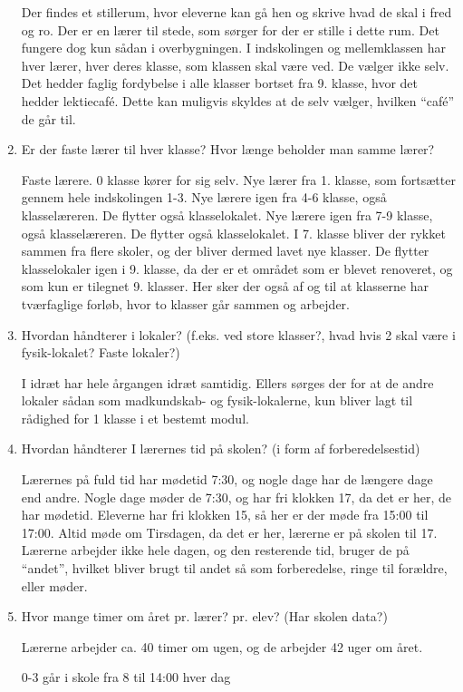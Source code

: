 \begin{enumerate}
	Der findes et stillerum, hvor eleverne kan gå hen og skrive hvad de skal i fred og ro. Der er en lærer til stede, som sørger for der er stille i dette rum.
	Det fungere dog kun sådan i overbygningen. I indskolingen og mellemklassen har hver lærer, hver deres klasse, som klassen skal være ved. De vælger ikke selv.
	Det hedder faglig fordybelse i alle klasser bortset fra 9. klasse, hvor det hedder lektiecafé. Dette kan muligvis skyldes at de selv vælger, hvilken ``café'' de går til.
	\item Er der faste lærer til hver klasse? Hvor længe beholder man samme lærer?
	
	Faste lærere.
	0 klasse kører for sig selv.
	Nye lærer fra 1. klasse, som fortsætter gennem hele indskolingen 1-3.
	Nye lærere igen fra 4-6 klasse, også klasselæreren. De flytter også klasselokalet.
	Nye lærere igen fra 7-9 klasse, også klasselæreren. De flytter også klasselokalet. I 7. klasse bliver der rykket sammen fra flere skoler, og der bliver dermed lavet nye klasser. De flytter klasselokaler igen i 9. klasse, da der er et området som er blevet renoveret, og som kun er tilegnet 9. klasser. Her sker der også af og til at klasserne har tværfaglige forløb, hvor to klasser går sammen og arbejder.
	\item Hvordan håndterer i lokaler? (f.eks. ved store klasser?, hvad hvis 2 skal være i fysik-lokalet? Faste lokaler?)
	
	I idræt har hele årgangen idræt samtidig. Ellers sørges der for at de andre lokaler sådan som madkundskab- og fysik-lokalerne, kun bliver lagt til rådighed for 1 klasse i et bestemt modul.
	\item Hvordan håndterer I lærernes tid på skolen? (i form af forberedelsestid)
	
	Lærernes på fuld tid har mødetid 7:30, og nogle dage har de længere dage end andre. Nogle dage møder de 7:30, og har fri klokken 17, da det er her, de har mødetid. Eleverne har fri klokken 15, så her er der møde fra 15:00 til 17:00. Altid møde om Tirsdagen, da det er her, lærerne er på skolen til 17. Lærerne arbejder ikke hele dagen, og den resterende tid, bruger de på ``andet'', hvilket bliver brugt til andet så som forberedelse, ringe til forældre, eller møder.
	\item Hvor mange timer om året pr. lærer? pr. elev? (Har skolen data?)
	
	Lærerne arbejder ca. 40 timer om ugen, og de arbejder 42 uger om året.
	
	0-3 går i skole fra 8 til 14:00 hver dag
	

\end{enumerate}

